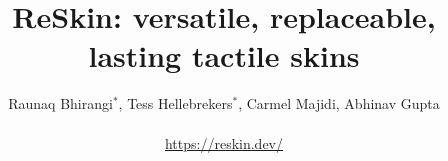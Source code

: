 \documentclass{article}
\begin{document}
\title{ReSkin: versatile, replaceable, lasting tactile skins}



\author{
  Raunaq Bhirangi$^*$, Tess Hellebrekers$^*$, Carmel Majidi, Abhinav Gupta \\\\
  \url{https://reskin.dev/}
}
\def\thefootnote{*}

\def\thefootnote{\arabic{footnote}}
\vspace{-0.3in}





% 
\end{document}
